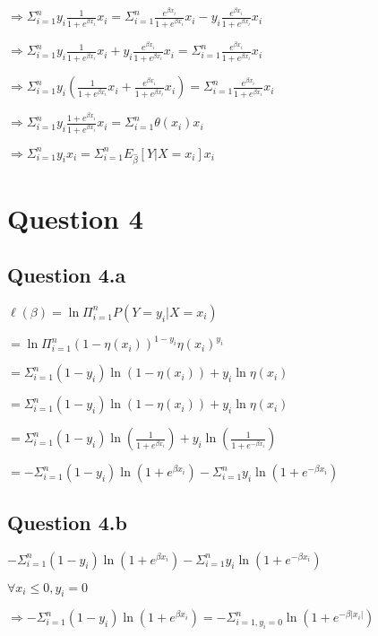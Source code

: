 \documentclass[
]{article}
\begin{document}
\(\Rightarrow \Sigma_{i=1}^ny_i\frac{1}{1+e^{\beta x_i}}x_i=\Sigma_{i=1}^n\frac{e^{\beta x_i}}{1+e^{\beta x_i}}x_i-y_i\frac{e^{\beta x_i}}{1+e^{\beta x_i}}x_i\)

\(\Rightarrow \Sigma_{i=1}^ny_i\frac{1}{1+e^{\beta x_i}}x_i+y_i\frac{e^{\beta x_i}}{1+e^{\beta x_i}}x_i=\Sigma_{i=1}^n\frac{e^{\beta x_i}}{1+e^{\beta x_i}}x_i\)

\(\Rightarrow \Sigma_{i=1}^ny_i(\frac{1}{1+e^{\beta x_i}}x_i+\frac{e^{\beta x_i}}{1+e^{\beta x_i}}x_i)=\Sigma_{i=1}^n\frac{e^{\beta x_i}}{1+e^{\beta x_i}}x_i\)

\(\Rightarrow \Sigma_{i=1}^ny_i\frac{1+e^{\beta x_i}}{1+e^{\beta x_i}}x_i=\Sigma_{i=1}^n\theta(x_i)x_i\)

\(\Rightarrow \Sigma_{i=1}^ny_ix_i=\Sigma_{i=1}^nE_{\hat\beta}[Y|X=x_i]x_i\)

\hypertarget{question-4}{%
\section{Question 4}\label{question-4}}

\hypertarget{question-4.a}{%
\subsection{Question 4.a}\label{question-4.a}}

\(\ell(\beta) = \ln\Pi_{i=1}^n P(Y=y_i|X=x_i)\)

\(=\ln\Pi_{i=1}^n(1-\eta(x_i))^{1-y_i}\eta(x_i)^{y_i}\)

\(=\Sigma_{i=1}^n(1-y_i)\ln(1-\eta(x_i))+y_i\ln\eta(x_i)\)

\(=\Sigma_{i=1}^n(1-y_i)\ln(1-\eta(x_i))+y_i\ln\eta(x_i)\)

\(=\Sigma_{i=1}^n(1-y_i)\ln(\frac{1}{1+e^{\beta x_i}})+y_i\ln(\frac{1}{1+e^{-\beta x_i}})\)

\(=-\Sigma_{i=1}^n(1-y_i)\ln(1+e^{\beta x_i})-\Sigma_{i=1}^ny_i\ln(1+e^{-\beta x_i})\)

\hypertarget{question-4.b}{%
\subsection{Question 4.b}\label{question-4.b}}

\(-\Sigma_{i=1}^n(1-y_i)\ln(1+e^{\beta x_i})-\Sigma_{i=1}^ny_i\ln(1+e^{-\beta x_i})\)

\(\forall x_i\leq 0, y_i=0\)

\(\Rightarrow -\Sigma_{i=1}^n(1-y_i)\ln(1+e^{\beta x_i}) = -\Sigma_{i=1, y_i=0}^n\ln(1+e^{-\beta|x_i|})\)
\end{document}
